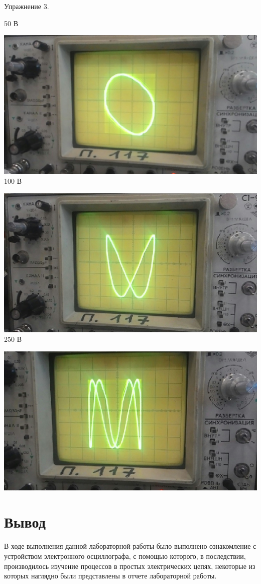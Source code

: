 \documentclass[12pt]{article}
\begin{document}
\begin{center}
\newpage
Упражнение 3.

50 В

\includegraphics{img2}\\

100 В

\includegraphics{img3}\\

250 В

\includegraphics{img4}
\end{center}
\section*{Вывод}
В ходе выполнения данной лабораторной работы было выполнено ознакомление с устройством электронного осциллографа, с помощью которого, в последствии, производилось изучение процессов в простых электрических цепях, некоторые из которых наглядно были представлены в отчете лабораторной работы.
\end{document}
